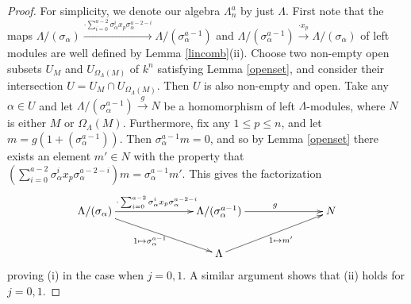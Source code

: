 \documentclass[a4paper]{amsart}
\theoremstyle{definition}
\theoremstyle{definition}
\theoremstyle{definition}
\theoremstyle{definition}
\theoremstyle{definition}
\theoremstyle{definition}
\theoremstyle{remark}
\theoremstyle{remark}
\theoremstyle{definition}
\theoremstyle{definition}
\begin{document}
\begin{proof}
\sloppy For simplicity, we denote our algebra $\Lambda^a_n$ by just
$\Lambda$. First note that the maps $\Lambda / ( \sigma_{\alpha} )
\xrightarrow{\cdot \sum_{i=0}^{a-2} \sigma_{\alpha}^i x_p
\sigma_{\alpha}^{a-2-i}} \Lambda / ( \sigma_{\alpha}^{a-1} )$ and
$\Lambda / ( \sigma_{\alpha}^{a-1} ) \xrightarrow{\cdot x_p} \Lambda
/ ( \sigma_{\alpha} )$ of left modules are well defined by Lemma
\ref{lincomb}(ii). Choose two non-empty open subsets $U_M$ and
$U_{\Omega_{\Lambda}(M)}$ of $k^n$ satisfying Lemma \ref{openset},
and consider their intersection $U = U_M \cap
U_{\Omega_{\Lambda}(M)}$. Then $U$ is also non-empty and open. Take
any $\alpha \in U$ and let $\Lambda / ( \sigma_{\alpha}^{a-1} )
\xrightarrow{g} N$ be a homomorphism of left $\Lambda$-modules,
where $N$ is either $M$ or $\Omega_{\Lambda}(M)$. Furthermore, fix
any $1 \le p \le n$, and let $m = g( 1 + ( \sigma_{\alpha}^{a-1} )
)$. Then $\sigma_{\alpha}^{a-1} m =0$, and so by Lemma \ref{openset}
there exists an element $m' \in N$ with the property that $\left (
\sum_{i=0}^{a-2} \sigma_{\alpha}^i x_p \sigma_{\alpha}^{a-2-i}
\right ) m = \sigma_{\alpha}^{a-1} m'$. This gives the factorization
$$\xymatrix@C=70pt{
\Lambda / ( \sigma_{\alpha} ) \ar[r]^{\cdot \sum_{i=0}^{a-2}
\sigma_{\alpha}^i x_p \sigma_{\alpha}^{a-2-i}} \ar[dr]_{1 \mapsto
\sigma_{\alpha}^{a-1}} & \Lambda / ( \sigma_{\alpha}^{a-1} )
\ar[r]^g & N \\
& \Lambda \ar[ur]_{1 \mapsto m'} }$$ proving (i) in the case when
$j=0,1$. A similar argument shows that (ii) holds for $j=0,1$.


\end{proof}
\end{document}
